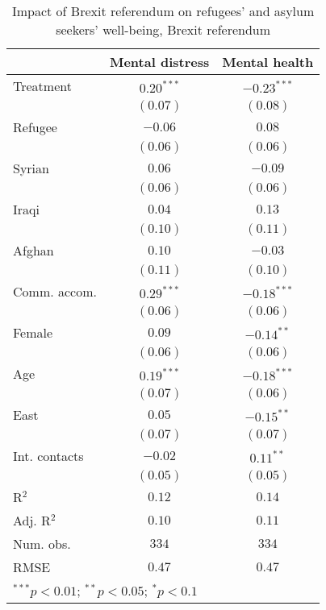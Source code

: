 
\begin{table}
\caption{Impact of Brexit referendum on refugees' and asylum seekers' well-being, Brexit referendum}
\begin{center}
\begin{tabular}{l c c}
\toprule
 & Mental distress & Mental health \\
\midrule
Treatment     & $0.20^{***}$ & $-0.23^{***}$ \\
              & $(0.07)$     & $(0.08)$      \\
Refugee       & $-0.06$      & $0.08$        \\
              & $(0.06)$     & $(0.06)$      \\
Syrian        & $0.06$       & $-0.09$       \\
              & $(0.06)$     & $(0.06)$      \\
Iraqi         & $0.04$       & $0.13$        \\
              & $(0.10)$     & $(0.11)$      \\
Afghan        & $0.10$       & $-0.03$       \\
              & $(0.11)$     & $(0.10)$      \\
Comm. accom.  & $0.29^{***}$ & $-0.18^{***}$ \\
              & $(0.06)$     & $(0.06)$      \\
Female        & $0.09$       & $-0.14^{**}$  \\
              & $(0.06)$     & $(0.06)$      \\
Age           & $0.19^{***}$ & $-0.18^{***}$ \\
              & $(0.07)$     & $(0.06)$      \\
East          & $0.05$       & $-0.15^{**}$  \\
              & $(0.07)$     & $(0.07)$      \\
Int. contacts & $-0.02$      & $0.11^{**}$   \\
              & $(0.05)$     & $(0.05)$      \\
\midrule
R$^2$         & $0.12$       & $0.14$        \\
Adj. R$^2$    & $0.10$       & $0.11$        \\
Num. obs.     & $334$        & $334$         \\
RMSE          & $0.47$       & $0.47$        \\
\bottomrule
\multicolumn{3}{l}{\scriptsize{$^{***}p<0.01$; $^{**}p<0.05$; $^{*}p<0.1$}}
\end{tabular}
\label{tab_mhealth_brexit}
\end{center}
\end{table}
